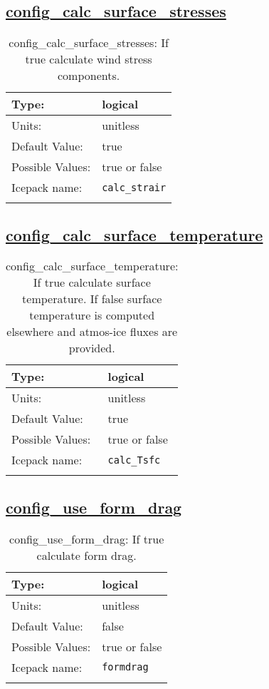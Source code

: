 \subsection[config\_calc\_surface\_stresses]{\hyperref[sec:nm_tab_atmosphere]{config\_calc\_surface\_stresses}}
\label{subsec:nm_sec_config_calc_surface_stresses}
\begin{center}
\begin{longtable}{| p{2.0in} || p{4.0in} |}
    \hline
    Type: & logical \\
    \hline
    Units: & \si{unitless} \\
    \hline
    Default Value: & true \\
    \hline
    Possible Values: & true or false \\
    \hline
    Icepack name: & \verb+calc_strair+ \\
    \hline
    \caption{config\_calc\_surface\_stresses: If true calculate wind stress components.}
\end{longtable}
\end{center}
\subsection[config\_calc\_surface\_temperature]{\hyperref[sec:nm_tab_atmosphere]{config\_calc\_surface\_temperature}}
\label{subsec:nm_sec_config_calc_surface_temperature}
\begin{center}
\begin{longtable}{| p{2.0in} || p{4.0in} |}
    \hline
    Type: & logical \\
    \hline
    Units: & \si{unitless} \\
    \hline
    Default Value: & true \\
    \hline
    Possible Values: & true or false \\
    \hline
    Icepack name: & \verb+calc_Tsfc+ \\
    \hline
    \caption{config\_calc\_surface\_temperature: If true calculate surface temperature. If false surface temperature is computed elsewhere and atmos-ice fluxes are provided.}
\end{longtable}
\end{center}
\subsection[config\_use\_form\_drag]{\hyperref[sec:nm_tab_atmosphere]{config\_use\_form\_drag}}
\label{subsec:nm_sec_config_use_form_drag}
\begin{center}
\begin{longtable}{| p{2.0in} || p{4.0in} |}
    \hline
    Type: & logical \\
    \hline
    Units: & \si{unitless} \\
    \hline
    Default Value: & false \\
    \hline
    Possible Values: & true or false \\
    \hline
    Icepack name: & \verb+formdrag+ \\
    \hline
    \caption{config\_use\_form\_drag: If true calculate form drag.}
\end{longtable}
\end{center}
